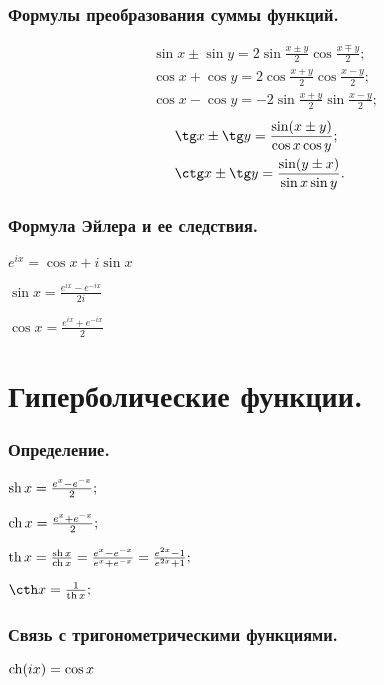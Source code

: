 \subsubsection{Формулы преобразования суммы функций.}
\vspace*{-1.8\baselineskip}
\begin{multicols}{2}
\begin{align*}
&\sin x\pm \sin y =2 \sin \frac{x\pm y}{2} \cos \frac{x\mp y}{2};\\
&\cos x + \cos y  = 2 \cos \frac{x + y}{2} \cos \frac{x - y}{2};\\
&\cos x - \cos y  = -2 \sin \frac{x + y}{2} \sin\frac{x - y}{2};
\end{align*}
\vfill
\columnbreak
\begin{align*}
&\tg x \pm \tg y = \frac{\sin (x \pm y)}{ \cos x \cos y};\\
&\ctg x \pm \tg y = \frac{\sin (y \pm x)}{ \sin x \sin y}.
\end{align*}
\end{multicols}

\subsubsection{Формула Эйлера и ее следствия.}
$e^{ix} = \cos x + i \sin x$

$\sin x = \frac{e^{ix}-e^{-ix}}{2i}$

$\cos x = \frac{e^{ix}+e^{-ix}}{2}$

\section{Гиперболические функции.}

\subsubsection{Определение.}
$\mathop{\rm sh}\nolimits x = \frac{e^{x}-e^{-x}}{2};$

$\mathop{\rm ch}\nolimits x = \frac{e^{x}+e^{-x}}{2};$

$\mathop{\rm th}\nolimits x = \frac{\mathop{\rm sh}\nolimits x}{\mathop{\rm ch}\nolimits x}=\frac{e^{x}-e^{-x}}{e^{x}+e^{-x}}=\frac{e^{2x}-1}{e^{2x}+1};$

$\cth x = \frac{1}{\th x};$

\subsubsection{Связь с тригонометрическими функциями.}

$\mathop{\rm ch}\nolimits (ix) = \cos x$

